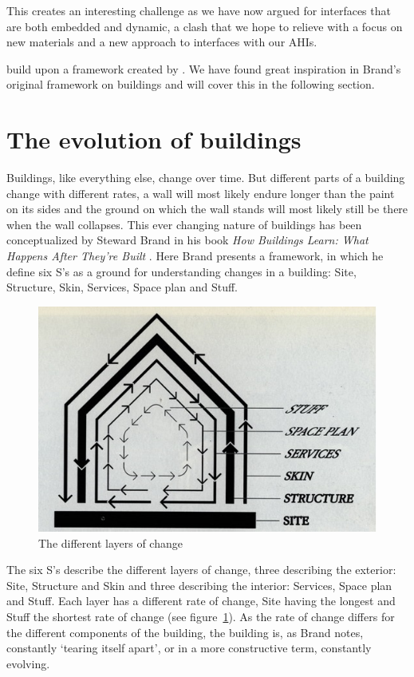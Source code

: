 This creates an interesting challenge as we have now argued for interfaces that are both embedded and dynamic, a clash that we hope to relieve with a focus on new materials and a new approach to interfaces with our AHIs. 

\citet{rodden2003evolution} build upon a framework created by \citet{brand1995buildings}. 
We have found great inspiration in Brand's original framework on buildings and will cover this in the following section.

\section{The evolution of buildings}
Buildings, like everything else, change over time.
But different parts of a building change with different rates, a wall will most likely endure longer than the paint on its sides and the ground on which the wall stands will most likely still be there when the wall collapses.
This ever changing nature of buildings has been conceptualized by Steward Brand in his book \emph{How Buildings Learn: What Happens After They're Built} \citep{brand1995buildings}.
Here Brand presents a framework, in which he define six S's as a ground for understanding changes in a building: Site, Structure, Skin, Services, Space plan and Stuff.

\begin{figure}[h]
	\centering
  		\includegraphics[width=.9\textwidth]{figures/brand-diagram}
	\caption{The different layers of change \citep[chapter 2]{brand1995buildings}}
   \label{brand-diagram}
\end{figure}

The six S's describe the different layers of change, three describing the exterior: Site, Structure and Skin and three describing the interior: Services, Space plan and Stuff.
Each layer has a different rate of change, Site having the longest and Stuff the shortest rate of change (see figure~\ref{brand-diagram}).
As the rate of change differs for the different components of the building, the building is, as Brand notes, constantly `tearing itself apart', or in a more constructive term, constantly evolving.


